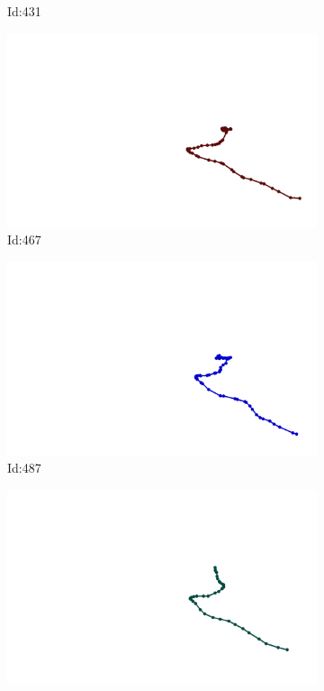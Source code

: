 \documentclass[12pt,twoside]{report}
\begin{document}
\begin{figure}
\begin{subfigure}[b]{0.20\textwidth}
\caption{Id:431}
\end{subfigure}
\begin{subfigure}[b]{0.20\textwidth}
\centering
\includegraphics[width=\textwidth]{../../trajectories/467.png}
\caption{Id:467}
\end{subfigure}
\begin{subfigure}[b]{0.20\textwidth}
\centering
\includegraphics[width=\textwidth]{../../trajectories/487.png}
\caption{Id:487}
\end{subfigure}
\begin{subfigure}[b]{0.20\textwidth}
\centering
\includegraphics[width=\textwidth]{../../trajectories/643.png}

\end{subfigure}
\end{figure}
\end{document}
